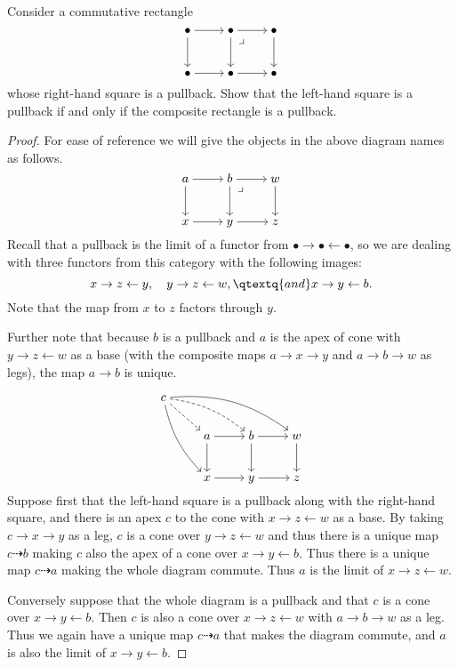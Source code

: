 \documentclass[../../main]{subfiles}
\begin{document}
\paragraph{}
\begin{exercise}
	Consider a commutative rectangle
	\[\begin{tikzcd}[cramped]
			\bullet \ar[r] \ar[d] &
			\bullet \ar[r] \ar[d] \ar[dr, phantom, "\lrcorner", very near start] &
			\bullet \ar[d] \\[0.6em]
			\bullet \ar[r] &
			\bullet \ar[r] &
			\bullet
	\end{tikzcd}\]
	whose right-hand square is a pullback. Show that the left-hand square is a
	pullback if and only if the composite rectangle is a pullback.
\end{exercise}

\begin{proof}
	For ease of reference we will give the objects in the above diagram names as
	follows.
	\[\begin{tikzcd}[cramped]
			a \ar[r] \ar[d] &
			b \ar[r] \ar[d] \ar[dr, phantom, "\lrcorner", very near start] &
			w \ar[d] \\[0.6em]
			x \ar[r] &
			y \ar[r] &
			z
	\end{tikzcd}\]
	Recall that a pullback is the limit of a functor from
	\(\bullet\to\bullet\gets\bullet\), so we are dealing with three functors
	from this category with the following images:
	\[x\to z\gets y,\quad y\to z\gets w,\qtextq{and} x\to y\gets b .\] Note that
	the map from \(x\) to \(z\) factors through \(y\).

	Further note that because \(b\) is a pullback and \(a\) is the apex of cone
	with \(y\to z\gets w\) as a base (with the composite maps \(a\to x\to y\)
	and \(a\to b\to w\) as legs), the map \(a\to b\) is unique.

	\[\begin{tikzcd}[cramped]
			c \ar[dr, dashed] \ar[drr, dashed, bend left=15]
			\ar[drrr, bend left=20] \ar[ddr, bend right=15] \\ &
			a \ar[r] \ar[d] &
			b \ar[r] \ar[d] &
			w \ar[d] \\[0.5em] &
			x \ar[r] &
			y \ar[r] &
			z
	\end{tikzcd}\]
	Suppose first that the left-hand square is a pullback along with the
	right-hand square, and there is an apex \(c\) to the cone with
	\(x\to z\gets w\) as a base.
	By taking \(c\to x\to y\) as a leg, \(c\) is a cone over
	\(y\to z\gets w\) and thus there is a unique map \(c\dashrightarrow b\)
	making \(c\) also the apex of a cone over \(x\to y\gets b\). Thus there is a
	unique map \(c\dashrightarrow a\) making the whole diagram commute. Thus
	\(a\) is the limit of \(x\to z\gets w\).
	
	Conversely suppose that the whole diagram is a pullback and that \(c\) is a
	cone over \(x\to y\gets b\). Then \(c\) is also a cone over
	\(x\to z\gets w\) with \(a\to b\to w\) as a leg. Thus we again have a unique
	map \(c\dashrightarrow a\) that makes the diagram commute, and \(a\) is also
	the limit of \(x\to y\gets b\).
\end{proof}
\end{document}

